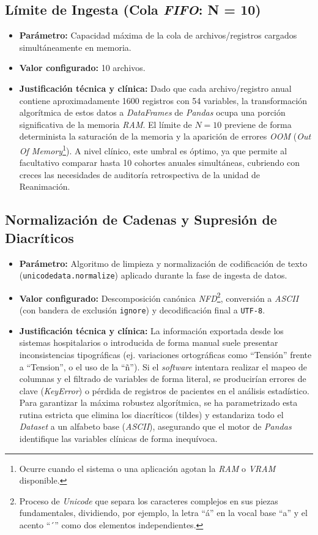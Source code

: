 \subsection{Límite de Ingesta (Cola \textit{FIFO}: N = 10)}
\begin{itemize}
    \item \textbf{Parámetro:} Capacidad máxima de la cola de archivos/registros cargados simultáneamente en memoria.
    \item \textbf{Valor configurado:} 10 archivos.
    \item \textbf{Justificación técnica y clínica:} Dado que cada archivo/registro anual contiene aproximadamente 1600 registros con 54 variables, la transformación algorítmica de estos datos a \textit{DataFrames} de \textit{Pandas} ocupa una porción significativa de la memoria \textit{RAM}. El límite de $N=10$ previene de forma determinista la saturación de la memoria y la aparición de errores \textit{OOM} (\textit{Out Of Memory}\footnote{Ocurre cuando el sistema o una aplicación agotan la \textit{RAM} o \textit{VRAM} disponible.}). A nivel clínico, este umbral es óptimo, ya que permite al facultativo comparar hasta 10 cohortes anuales simultáneas, cubriendo con creces las necesidades de auditoría retrospectiva de la unidad de Reanimación.
\end{itemize}

\subsection{Normalización de Cadenas y Supresión de Diacríticos}
\begin{itemize}
    \item \textbf{Parámetro:} Algoritmo de limpieza y normalización de codificación de texto (\texttt{unicodedata.normalize}) aplicado durante la fase de ingesta de datos.
    \item \textbf{Valor configurado:} Descomposición canónica \textit{NFD}\footnote{Proceso de \textit{Unicode} que separa los caracteres complejos en sus piezas fundamentales, dividiendo, por ejemplo, la letra ``á'' en la vocal base ``a'' y el acento ``´'' como dos elementos independientes.}, conversión a \textit{ASCII} (con bandera de exclusión \texttt{ignore}) y decodificación final a \texttt{UTF-8}.
    \item \textbf{Justificación técnica y clínica:} La información exportada desde los sistemas hospitalarios o introducida de forma manual suele presentar inconsistencias tipográficas (ej. variaciones ortográficas como ``Tensión'' frente a ``Tension'', o el uso de la ``ñ''). Si el \textit{software} intentara realizar el mapeo de columnas y el filtrado de variables de forma literal, se producirían errores de clave (\textit{KeyError}) o pérdida de registros de pacientes en el análisis estadístico. Para garantizar la máxima robustez algorítmica, se ha parametrizado esta rutina estricta que elimina los diacríticos (tildes) y estandariza todo el \textit{Dataset} a un alfabeto base (\textit{ASCII}), asegurando que el motor de \textit{Pandas} identifique las variables clínicas de forma inequívoca.
\end{itemize}

